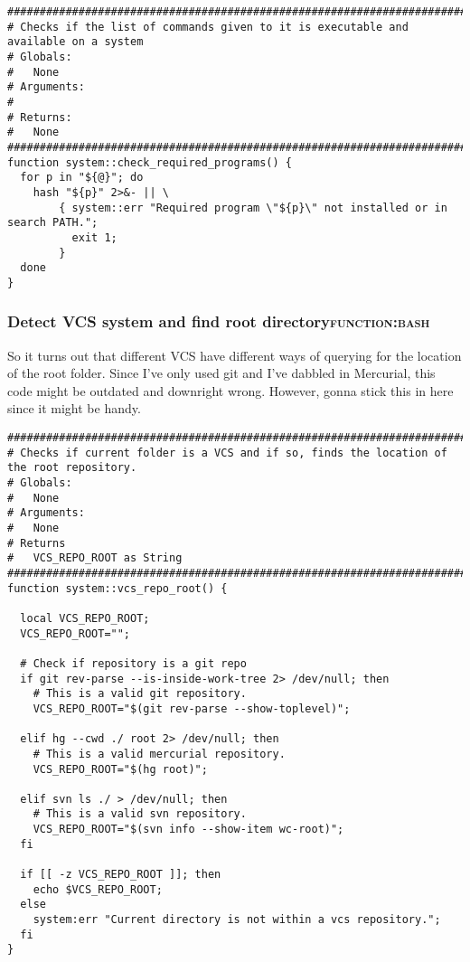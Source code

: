 \documentclass[11pt]{article}
\begin{document}
\begin{verbatim}
#####################################################################################
# Checks if the list of commands given to it is executable and available on a system
# Globals:
#   None
# Arguments:
#
# Returns:
#   None
#####################################################################################
function system::check_required_programs() {
  for p in "${@}"; do
    hash "${p}" 2>&- || \
        { system::err "Required program \"${p}\" not installed or in search PATH.";
          exit 1;
        }
  done
}
\end{verbatim}

\subsubsection{Detect VCS system and find root directory\hfill{}\textsc{function:bash}}
\label{sec:org7a35f00}

So it turns out that different VCS have different ways of querying for the location of the root folder. Since I've only used git and I've dabbled in Mercurial, this code might be outdated and downright wrong. However, gonna stick this in here since it might be handy.

\begin{verbatim}
##########################################################################################
# Checks if current folder is a VCS and if so, finds the location of the root repository.
# Globals:
#   None
# Arguments:
#   None
# Returns
#   VCS_REPO_ROOT as String
##########################################################################################
function system::vcs_repo_root() {

  local VCS_REPO_ROOT;
  VCS_REPO_ROOT="";

  # Check if repository is a git repo
  if git rev-parse --is-inside-work-tree 2> /dev/null; then
    # This is a valid git repository.
    VCS_REPO_ROOT="$(git rev-parse --show-toplevel)";

  elif hg --cwd ./ root 2> /dev/null; then
    # This is a valid mercurial repository.
    VCS_REPO_ROOT="$(hg root)";

  elif svn ls ./ > /dev/null; then
    # This is a valid svn repository.
    VCS_REPO_ROOT="$(svn info --show-item wc-root)";
  fi

  if [[ -z VCS_REPO_ROOT ]]; then
    echo $VCS_REPO_ROOT;
  else
    system:err "Current directory is not within a vcs repository.";
  fi 
}
\end{verbatim}
\end{document}

